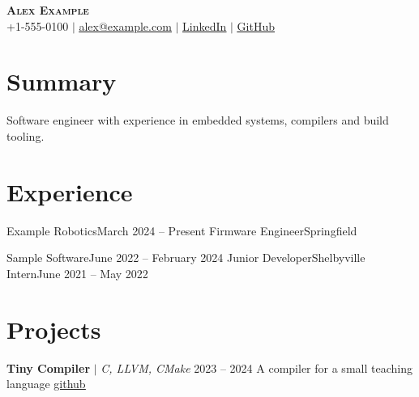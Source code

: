 \documentclass[letterpaper,11pt]{article}
\begin{document}
\begin{center}
    \textbf{\Huge \scshape Alex Example} \\ \vspace{1pt}
    \small +1-555-0100 $|$ \href{mailto:alex@example.com}{\underline{alex@example.com}} $|$
    \href{https://www.linkedin.com/in/alex-example}{\underline{LinkedIn}} $|$
    \href{https://github.com/alex-example}{\underline{GitHub}}
\end{center}


\section{Summary}
    \resumeSubHeadingListStart
        \item{
            Software engineer with experience in embedded systems, compilers and build tooling.
        }
    \resumeSubHeadingListEnd


\section{Experience}
    \resumeSubHeadingListStart

        \resumeSubheading
            {Example Robotics}{March 2024 -- Present}
            {Firmware Engineer}{Springfield}
            \resumeItemListStart
            \resumeItemListEnd

        \resumeSubheading
            {Sample Software}{June 2022 -- February 2024}
            {Junior Developer}{Shelbyville}
            \resumeSubSubheading
                {Intern}{June 2021 -- May 2022}

    \resumeSubHeadingListEnd


\section{Projects}
    \resumeSubHeadingListStart

        \resumeProjectHeading
            {\textbf{Tiny Compiler} $|$ \emph{C, LLVM, CMake}}
            {2023 -- 2024}
        \resumeProjectHeading
            {A compiler for a small teaching language}
            {\href{https://github.com/alex-example/tiny-compiler}{\underline{github}}}
            \resumeItemListStart
            \resumeItemListEnd
\end{document}
